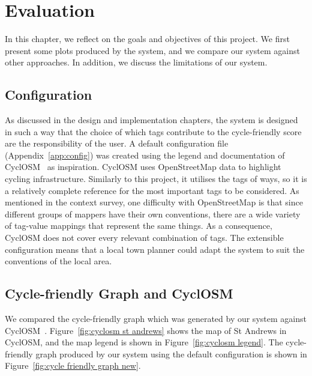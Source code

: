 \documentclass[12pt,a4paper]{report}
\begin{document}
\chapter{Evaluation}\label{chapter:eval}
In this chapter, we reflect on the goals and objectives of this project. We first present some plots produced by the system, and we compare our system against other approaches. In addition, we discuss the limitations of our system.

\section{Configuration}
As discussed in the design and implementation chapters, the system is designed in such a way that the choice of which tags contribute to the cycle-friendly score are the responsibility of the user. A default configuration file (Appendix~\ref{app:config}) was created using the legend and documentation of CyclOSM~\cite{cycleOSM} as inspiration. CyclOSM uses OpenStreetMap data to highlight cycling infrastructure. Similarly to this project, it utilises the tags of ways, so it is a relatively complete reference for the most important tags to be considered. As mentioned in the context survey, one difficulty with OpenStreetMap is that since different groups of mappers have their own conventions, there are a wide variety of tag-value mappings that represent the same things. As a consequence, CyclOSM does not cover every relevant combination of tags. The extensible configuration means that a local town planner could adapt the system to suit the conventions of the local area.

\section{Cycle-friendly Graph and CyclOSM}\label{sec:eval_osm}
We compared the cycle-friendly graph which was generated by our system against CyclOSM~\cite{cycleOSM}. Figure~\ref{fig:cyclosm st andrews} shows the map of St Andrews in CyclOSM, and the map legend is shown in Figure~\ref{fig:cyclosm legend}. The cycle-friendly graph produced by our system using the default configuration is shown in Figure~\ref{fig:cycle friendly graph new}.
\end{document}
